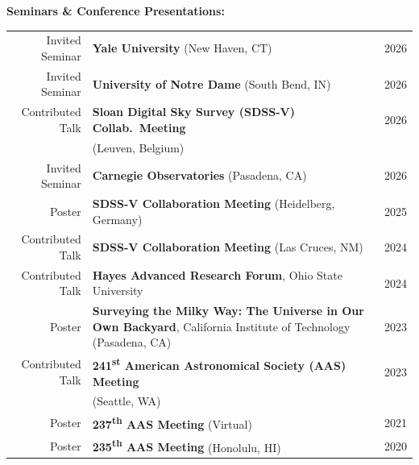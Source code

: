 \vspace{12pt}
\noindent
{\bf Seminars \& Conference Presentations:}

\vspace{-6pt}
\begin{tabularx}{\textwidth}{r X r}
    Invited Seminar     & {\bf Yale University} (New Haven, CT)             & 2026 \\
    Invited Seminar     & {\bf University of Notre Dame} (South Bend, IN)   & 2026 \\
    Contributed Talk    & {\bf Sloan Digital Sky Survey (SDSS-V) Collab.\ Meeting}      & 2026 \\
                        & (Leuven, Belgium) \\
    Invited Seminar     & {\bf Carnegie Observatories} (Pasadena, CA)          & 2026 \\
    Poster              & {\bf SDSS-V Collaboration Meeting} (Heidelberg, Germany) & 2025 \\
    Contributed Talk    & {\bf SDSS-V Collaboration Meeting} (Las Cruces, NM) & 2024 \\
    Contributed Talk    & {\bf Hayes Advanced Research Forum}, Ohio State University & 2024 \\
    Poster              & {\bf Surveying the Milky Way: The Universe in Our Own Backyard}, California Institute of Technology (Pasadena, CA) & 2023 \\
    Contributed Talk    & {\bf 241\textsuperscript{st} American Astronomical Society (AAS) Meeting} & 2023 \\
                        & (Seattle, WA) \\
    Poster              & {\bf 237\textsuperscript{th} AAS Meeting} (Virtual) & 2021 \\
    Poster              & {\bf 235\textsuperscript{th} AAS Meeting} (Honolulu, HI) & 2020 \\
    
\end{tabularx}



